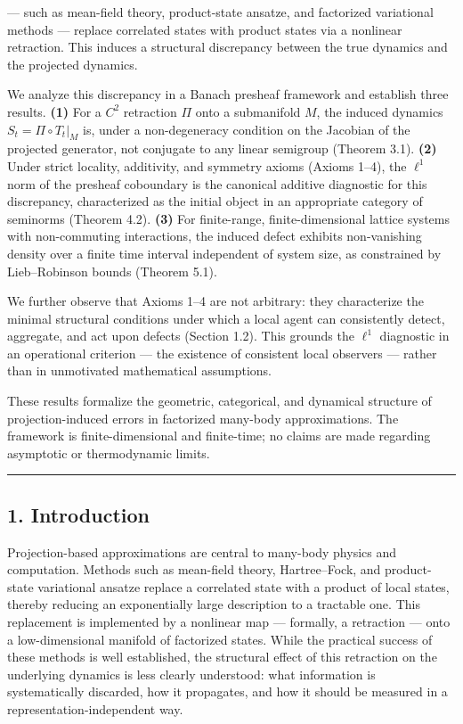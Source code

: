 \documentclass[
]{article}
\begin{document}
--- such as mean-field theory, product-state ansatze, and factorized
variational methods --- replace correlated states with product states
via a nonlinear retraction. This induces a structural discrepancy
between the true dynamics and the projected dynamics.

We analyze this discrepancy in a Banach presheaf framework and establish
three results. \textbf{(1)} For a \(C^2\) retraction \(\Pi\) onto a
submanifold \(M\), the induced dynamics \(S_t = \Pi \circ T_t|_M\) is,
under a non-degeneracy condition on the Jacobian of the projected
generator, not conjugate to any linear semigroup (Theorem 3.1).
\textbf{(2)} Under strict locality, additivity, and symmetry axioms
(Axioms 1--4), the \(\ell^1\) norm of the presheaf coboundary is the
canonical additive diagnostic for this discrepancy, characterized as the
initial object in an appropriate category of seminorms (Theorem 4.2).
\textbf{(3)} For finite-range, finite-dimensional lattice systems with
non-commuting interactions, the induced defect exhibits non-vanishing
density over a finite time interval independent of system size, as
constrained by Lieb--Robinson bounds (Theorem 5.1).

We further observe that Axioms 1--4 are not arbitrary: they characterize
the minimal structural conditions under which a local agent can
consistently detect, aggregate, and act upon defects (Section 1.2). This
grounds the \(\ell^1\) diagnostic in an operational criterion --- the
existence of consistent local observers --- rather than in unmotivated
mathematical assumptions.

These results formalize the geometric, categorical, and dynamical
structure of projection-induced errors in factorized many-body
approximations. The framework is finite-dimensional and finite-time; no
claims are made regarding asymptotic or thermodynamic limits.

\begin{center}\rule{0.5\linewidth}{0.5pt}\end{center}

\subsection{1. Introduction}\label{introduction}

Projection-based approximations are central to many-body physics and
computation. Methods such as mean-field theory, Hartree--Fock, and
product-state variational ansatze replace a correlated state with a
product of local states, thereby reducing an exponentially large
description to a tractable one. This replacement is implemented by a
nonlinear map --- formally, a retraction --- onto a low-dimensional
manifold of factorized states. While the practical success of these
methods is well established, the structural effect of this retraction on
the underlying dynamics is less clearly understood: what information is
systematically discarded, how it propagates, and how it should be
measured in a representation-independent way.
\end{document}
